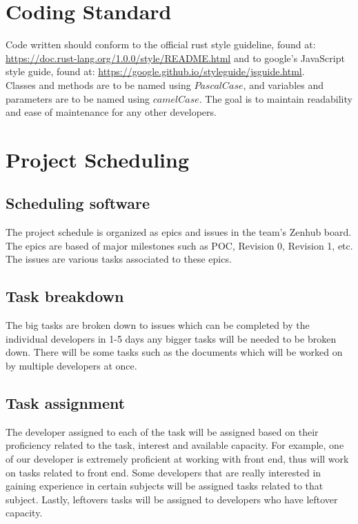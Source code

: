\documentclass{article}
\begin{document}
\section{Coding Standard}

Code written should conform to the official rust style guideline, found at: \url{https://doc.rust-lang.org/1.0.0/style/README.html} and to google's JavaScript style guide, found at: \url{https://google.github.io/styleguide/jsguide.html}.\\
Classes and methods are to be named using $PascalCase$, and variables and parameters are to be named using $camelCase$.
\newline
The goal is to maintain readability and ease of maintenance for any other developers.

\section{Project Scheduling}
\subsection{Scheduling software}
The project schedule is organized as epics and issues in the team's Zenhub board. The epics are based of major milestones such as POC, Revision 0, Revision 1, etc. The issues are various tasks associated to these epics.
\subsection{Task breakdown}
The big tasks are broken down to issues which can be completed by the individual developers in 1-5 days any bigger tasks will be needed to be broken down. There will be some tasks such as the documents which will be worked on by multiple developers at once.
\subsection{Task assignment}
The developer assigned to each of the task will be assigned based on their proficiency related to the task, interest and available capacity. For example, one of our developer is extremely proficient at working with front end, thus will work on tasks related to front end. Some developers that are really interested in gaining experience in certain subjects will be assigned tasks related to that subject. Lastly, leftovers tasks will be assigned to developers who have leftover capacity.
\end{document}
